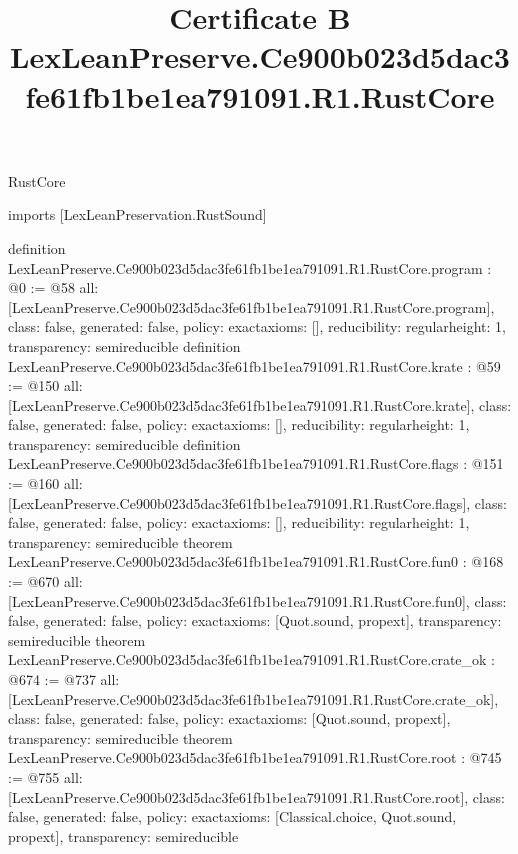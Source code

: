 \begin{lexlean}{RustCore}
\title{Certificate B LexLeanPreserve.Ce900b023d5dac3fe61fb1be1ea791091.R1.RustCore}
\begin{coremodule}
imports [LexLeanPreservation.RustSound]

definition LexLeanPreserve.Ce900b023d5dac3fe61fb1be1ea791091.R1.RustCore.program : @0 := @58 {
  all: [LexLeanPreserve.Ce900b023d5dac3fe61fb1be1ea791091.R1.RustCore.program],
  class: false,
  generated: false,
  policy: exact{axioms: []},
  reducibility: regular{height: 1},
  transparency: semireducible
}
definition LexLeanPreserve.Ce900b023d5dac3fe61fb1be1ea791091.R1.RustCore.krate : @59 := @150 {
  all: [LexLeanPreserve.Ce900b023d5dac3fe61fb1be1ea791091.R1.RustCore.krate],
  class: false,
  generated: false,
  policy: exact{axioms: []},
  reducibility: regular{height: 1},
  transparency: semireducible
}
definition LexLeanPreserve.Ce900b023d5dac3fe61fb1be1ea791091.R1.RustCore.flags : @151 := @160 {
  all: [LexLeanPreserve.Ce900b023d5dac3fe61fb1be1ea791091.R1.RustCore.flags],
  class: false,
  generated: false,
  policy: exact{axioms: []},
  reducibility: regular{height: 1},
  transparency: semireducible
}
theorem LexLeanPreserve.Ce900b023d5dac3fe61fb1be1ea791091.R1.RustCore.fun0 : @168 := @670 {
  all: [LexLeanPreserve.Ce900b023d5dac3fe61fb1be1ea791091.R1.RustCore.fun0],
  class: false,
  generated: false,
  policy: exact{axioms: [Quot.sound, propext]},
  transparency: semireducible
}
theorem LexLeanPreserve.Ce900b023d5dac3fe61fb1be1ea791091.R1.RustCore.crate_ok : @674 := @737 {
  all: [LexLeanPreserve.Ce900b023d5dac3fe61fb1be1ea791091.R1.RustCore.crate_ok],
  class: false,
  generated: false,
  policy: exact{axioms: [Quot.sound, propext]},
  transparency: semireducible
}
theorem LexLeanPreserve.Ce900b023d5dac3fe61fb1be1ea791091.R1.RustCore.root : @745 := @755 {
  all: [LexLeanPreserve.Ce900b023d5dac3fe61fb1be1ea791091.R1.RustCore.root],
  class: false,
  generated: false,
  policy: exact{axioms: [Classical.choice, Quot.sound, propext]},
  transparency: semireducible
}


\end{coremodule}
\end{lexlean}
